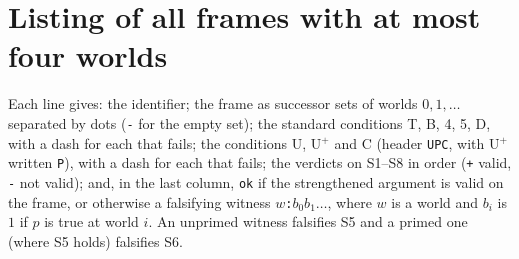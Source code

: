 \documentclass{situationist-preprint}
\begin{document}
\section{Listing of all frames with at most four worlds}\label{app:listing}

Each line gives: the identifier; the frame as successor sets of worlds $0, 1, \ldots$ separated by dots (\texttt{-} for the empty set); the standard conditions T, B, 4, 5, D, with a dash for each that fails; the conditions U, U$^+$ and C (header \texttt{UPC}, with U$^+$ written \texttt{P}), with a dash for each that fails; the verdicts on S1--S8 in order (\texttt{+} valid, \texttt{-} not valid); and, in the last column, \texttt{ok} if the strengthened argument is valid on the frame, or otherwise a falsifying witness $w$\texttt{:}$b_0b_1\ldots$, where $w$ is a world and $b_i$ is $1$ if $p$ is true at world $i$. An unprimed witness falsifies S5 and a primed one (where S5 holds) falsifies S6.


\end{document}
